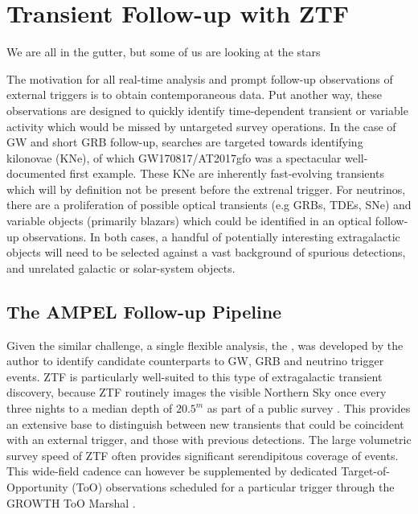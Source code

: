 \setchapterpreamble[u]{\margintoc}
\chapter{Transient Follow-up with ZTF}
\begin{fquote}We are all in the gutter, but some of us are looking at the stars
\end{fquote}

The motivation for all real-time analysis and prompt follow-up observations of external triggers is to obtain contemporaneous data. Put another way, these observations are designed to quickly identify time-dependent transient or variable activity which would be missed by untargeted survey operations.  In the case of GW and short GRB follow-up, searches are targeted towards identifying kilonovae (KNe), of which GW170817/AT2017gfo was a spectacular well-documented first example. These KNe are inherently fast-evolving transients which will by definition not be present before the extrenal trigger. For neutrinos, there are a proliferation of possible optical transients (e.g GRBs, TDEs, SNe) and variable objects (primarily blazars) which could be identified in an optical follow-up observations. In both cases, a handful of potentially interesting extragalactic objects will need to be selected against a vast background of spurious detections, and unrelated galactic or solar-system objects.

\section{The AMPEL Follow-up Pipeline}
Given the similar challenge, a single flexible analysis, the \ztf, was developed by the author to identify candidate counterparts to GW, GRB and neutrino trigger events. ZTF is particularly well-suited to this type of extragalactic transient discovery,  because ZTF routinely images the visible Northern Sky once every three nights to a median depth of $20.5^{m}$ as part of a public survey .  This provides an extensive base to distinguish between new transients that could be coincident with an external trigger, and those with previous detections. The large volumetric survey speed of ZTF often provides significant serendipitous coverage of events. This wide-field cadence can however be supplemented by dedicated Target-of-Opportunity (ToO) observations scheduled for a particular trigger through the GROWTH ToO Marshal . 

